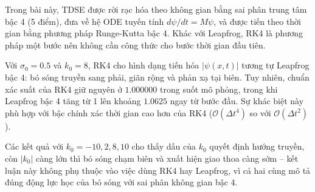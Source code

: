 \documentclass[12pt,a4paper]{article}
\begin{document}
Trong bài này, TDSE được rời rạc hóa theo không gian bằng sai phân trung tâm bậc 4 (5 điểm), đưa về hệ ODE tuyến tính $d\psi/dt=M\psi$, và được tiến theo thời gian bằng phương pháp Runge-Kutta bậc 4. Khác với Leapfrog, RK4 là phương pháp một bước nên không cần công thức cho bước thời gian đầu tiên.

Với $\sigma_0=0.5$ và $k_0=8$, RK4 cho hình dạng tiến hóa $|\psi(x,t)|$ tương tự Leapfrog bậc 4: bó sóng truyền sang phải, giãn rộng và phản xạ tại biên. Tuy nhiên, chuẩn xác suất của RK4 giữ nguyên ở $1.000000$ trong suốt mô phỏng, trong khi Leapfrog bậc 4 tăng từ 1 lên khoảng $1.0625$ ngay từ bước đầu. Sự khác biệt này phù hợp với bậc chính xác thời gian cao hơn của RK4 ($\mathcal O(\Delta t^4)$ so với $\mathcal O(\Delta t^2)$).

Các kết quả với $k_0=-10,2,8,10$ cho thấy dấu của $k_0$ quyết định hướng truyền, còn $|k_0|$ càng lớn thì bó sóng chạm biên và xuất hiện giao thoa càng sớm -- kết luận này không phụ thuộc vào việc dùng RK4 hay Leapfrog, vì cả hai cùng mô tả đúng động lực học của bó sóng với sai phân không gian bậc 4.

\end{document}
